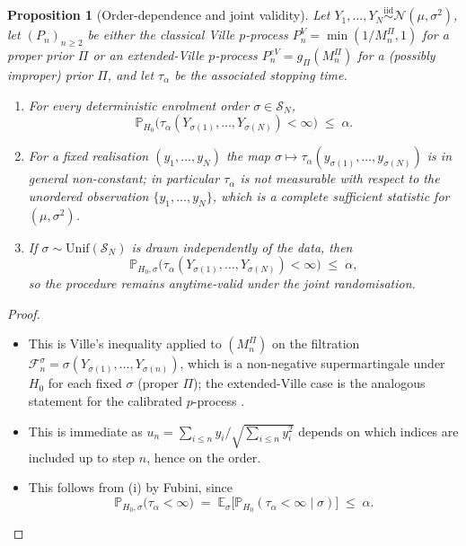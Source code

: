 \documentclass[numsec,webpdf,modern,medium,namedate]{oup-authoring-template}
\theoremstyle{thmstyleone}%
\newtheorem{proposition}[theorem]{Proposition}%
\theoremstyle{thmstyletwo}%
\theoremstyle{thmstylethree}%
\newcommand{\Prob}{\mathbb{P}}
\newcommand{\1}{\mathbf{1}}
\begin{document}
\begin{proposition}[Order-dependence and joint validity]
\label{prop:order-dependence}
Let $Y_{1},\ldots,Y_{N}\stackrel{\mathrm{iid}}{\sim}\mathcal{N}(\mu,\sigma^{2})$, let $(P_{n})_{n\ge 2}$ be either the classical Ville $p$-process $P_{n}^{V}=\min(1/M_{n}^{\Pi},1)$ for a proper prior $\Pi$ or an extended-Ville $p$-process $P_{n}^{eV}=g_{\Pi}(M_{n}^{\Pi})$ for a (possibly improper) prior $\Pi$, and let $\tau_{\alpha}$ be the associated stopping time.
\begin{enumerate}
\item[(i)] For every deterministic enrolment order $\sigma\in\mathcal{S}_{N}$,
   \[
      \Prob_{H_{0}}\bigl(\tau_{\alpha}(Y_{\sigma(1)},\ldots,Y_{\sigma(N)})<\infty\bigr)\;\le\;\alpha.
   \]
\item[(ii)] For a fixed realisation $(y_{1},\ldots,y_{N})$ the map $\sigma\mapsto\tau_{\alpha}(y_{\sigma(1)},\ldots,y_{\sigma(N)})$ is in general non-constant; in particular $\tau_{\alpha}$ is not measurable with respect to the unordered observation $\{y_{1},\ldots,y_{N}\}$, which is a complete sufficient statistic for $(\mu,\sigma^{2})$.
\item[(iii)] If $\sigma\sim\mathrm{Unif}(\mathcal{S}_{N})$ is drawn independently of the data, then
   \[
      \Prob_{H_{0},\sigma}\bigl(\tau_{\alpha}(Y_{\sigma(1)},\ldots,Y_{\sigma(N)})<\infty\bigr)\;\le\;\alpha,
   \]
   so the procedure remains anytime-valid under the joint randomisation.
\end{enumerate}
\end{proposition}

\begin{proof}
\begin{itemize}
\item[(i)] This is Ville's inequality applied to $(M_{n}^{\Pi})$ on the filtration $\mathcal{F}_{n}^{\sigma}=\sigma(Y_{\sigma(1)},\ldots,Y_{\sigma(n)})$, which is a non-negative supermartingale under $H_{0}$ for each fixed $\sigma$ (proper $\Pi$); the extended-Ville case is the analogous statement for the calibrated $p$-process \citep{wang2025extended}. 

\item[(ii)] This is immediate as $u_{n}=\sum_{i\le n}y_{i}/\sqrt{\sum_{i\le n}y_{i}^{2}}$ depends on which indices are included up to step $n$, hence on the order. 

\item[(iii)] This follows from (i) by Fubini, since
\[
   \Prob_{H_{0},\sigma}\bigl(\tau_{\alpha}<\infty\bigr) \;=\; \mathbb{E}_{\sigma}\bigl[\Prob_{H_{0}}(\tau_{\alpha}<\infty\mid\sigma)\bigr]\;\le\;\alpha.
\]
\end{itemize}
\end{proof}
\end{document}
